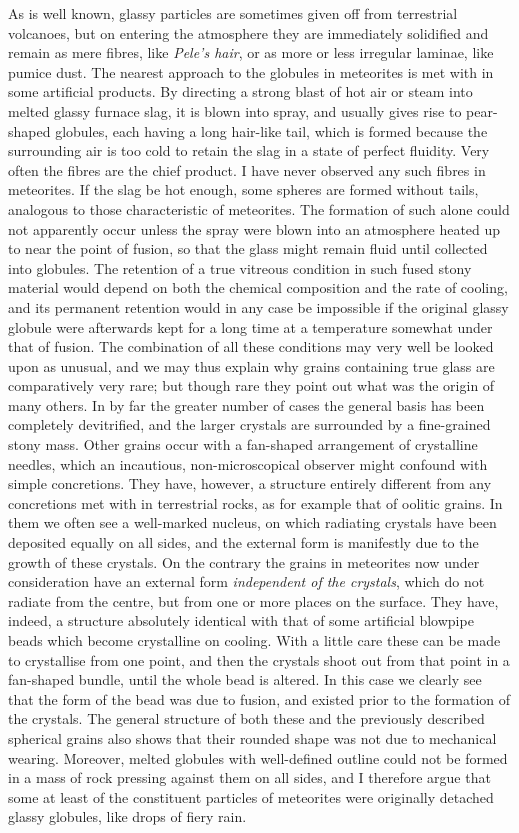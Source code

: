 \documentclass[a4paper, 12pt, oneside]{article}
\begin{document}
As is well known, glassy particles are sometimes given off from terrestrial volcanoes, but on entering the atmosphere they are immediately solidified and remain as mere fibres, like \emph{Pele's hair}, or as more or less irregular laminae, like pumice dust. The nearest approach to the globules in meteorites is met with in some artificial products. By directing a strong blast of hot air or steam into melted glassy furnace slag, it is blown into spray, and usually gives rise to pear-shaped globules, each having a long hair-like tail, which is formed because the surrounding air is too cold to retain the slag in a state of perfect fluidity. Very often the fibres are the chief product. I have never observed any such fibres in meteorites. If the slag be hot enough, some spheres are formed without tails, analogous to those characteristic of meteorites. The formation of such alone could not apparently occur unless the spray were blown into an atmosphere heated up to near the point of fusion, so that the glass might remain fluid until collected into globules. The retention of a true vitreous condition in such fused stony material would depend on both the chemical composition and the rate of cooling, and its permanent retention would in any case be impossible if the original glassy globule were afterwards kept for a long time at a temperature somewhat under that of fusion. The combination of all these conditions may very well be looked upon as unusual, and we may thus explain why grains containing true glass are comparatively very rare; but though rare they point out what was the origin of many others. In by far the greater number of cases the general basis has been completely devitrified, and the larger crystals are surrounded by a fine-grained stony mass. Other grains occur with a fan-shaped arrangement of crystalline needles, which an incautious, non-microscopical observer might confound with simple concretions. They have, however, a structure entirely different from any concretions met with in terrestrial rocks, as for example that of oolitic grains. In them we often see a well-marked nucleus, on which radiating crystals have been deposited equally on all sides, and the external form is manifestly due to the growth of these crystals. On the contrary the grains in meteorites now under consideration have an external form \emph{independent of the crystals}, which do not radiate from the centre, but from one or more places on the surface. They have, indeed, a structure absolutely identical with that of some artificial blowpipe beads which become crystalline on cooling. With a little care these can be made to crystallise from one point, and then the crystals shoot out from that point in a fan-shaped bundle, until the whole bead is altered. In this case we clearly see that the form of the bead was due to fusion, and existed prior to the formation of the crystals. The general structure of both these and the previously described spherical grains also shows that their rounded shape was not due to mechanical wearing. Moreover, melted globules with well-defined outline could not be formed in a mass of rock pressing against them on all sides, and I therefore argue that some at least of the constituent particles of meteorites were originally detached glassy globules, like drops of fiery rain.
\end{document}
